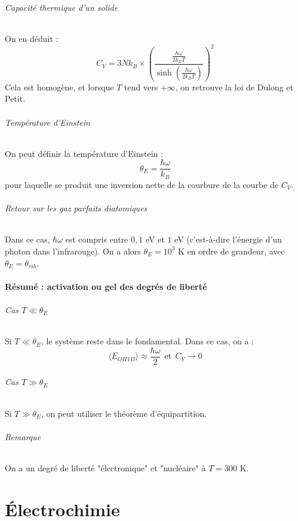\documentclass[french]{book}
\theoremstyle{plain}
\theoremstyle{definition}
\theoremstyle{remark}
\begin{document}
\paragraph{Capacité thermique d'un solide} On en déduit : $$C_V=3Nk_B\times\left(\displaystyle\frac{\displaystyle\frac{\hbar\omega}{2k_BT}}{\sinh\left(\frac{\hbar\omega}{2k_BT}\right)}\right)^2$$ Cela est homogène, et lorsque $T$ tend vers $+\infty$, on retrouve la loi de Dulong et Petit.

\paragraph{Température d'Einstein} On peut définir la température d'Einstein : $$\theta_E=\frac{\hbar\omega}{k_B}$$ pour laquelle se produit une inversion nette de la courbure de la courbe de $C_V$. 

\paragraph{Retour sur les gaz parfaits diatomiques} Dans ce cas, $\hbar\omega$ est compris entre $0,1$ eV et $1$ eV (c'est-à-dire l'énergie d'un photon dans l'infrarouge). On a alors $\theta_E=10^3$ K en ordre de grandeur, avec $\theta_E=\theta_{vib}$.

\subsection{Résumé : activation ou gel des degrés de liberté}

\paragraph{Cas $T\ll \theta_E$} Si $T\ll \theta_E$, le système reste dans le fondamental. Dans ce cas, on a : $$\langle E_{OH1D}\rangle\approx\frac{\hbar\omega}{2}\ \ \text{et}\ \  C_V\to 0$$

\paragraph{Cas $T\gg\theta_E$} Si $T\gg \theta_E$, on peut utiliser le théorème d'équipartition.

\paragraph{Remarque} On a un degré de liberté "électronique" et "nucléaire" à $T=300$ K.


\part{Électrochimie}
\end{document}
